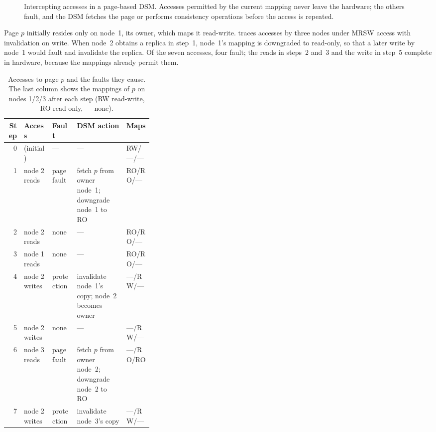 \documentclass[../main.tex]{subfiles}
\begin{document}
\begin{figure}[htbp]
  \centering
  
  \caption{Intercepting accesses in a page-based DSM.  Accesses permitted by
    the current mapping never leave the hardware; the others fault, and the
    DSM fetches the page or performs consistency operations before the
    access is repeated.}
  \label{fig:l15-mmu}
\end{figure}

\begin{example}
  Page $p$ initially resides only on node~1, its owner, which maps it
  read-write.   traces accesses by three nodes under MRSW
  access with invalidation on write.  When node~2 obtains a replica in
  step~1, node~1's mapping is downgraded to read-only, so that a later write
  by node~1 would fault and invalidate the replica.  Of the seven accesses,
  four fault; the reads in steps~2 and~3 and the write in step~5 complete
  in hardware, because the mappings already permit them.
\end{example}

\begin{table}[htbp]
  \centering
  \caption{Accesses to page $p$ and the faults they cause.  The last column
    shows the mappings of $p$ on nodes 1/2/3 after each step (RW
    read-write, RO read-only, --- none).}
  \label{tab:l15-mmu}
  \small
  \begin{tabular}{@{}rll>{\raggedright\arraybackslash}p{0.34\linewidth}l@{}}
    \toprule
    Step & Access & Fault & DSM action & Maps \\
    \midrule
    0 & (initial) & --- & --- & RW/---/--- \\
    1 & node 2 reads & page fault & fetch $p$ from owner node~1; downgrade
      node~1 to RO & RO/RO/--- \\
    2 & node 2 reads & none & --- & RO/RO/--- \\
    3 & node 1 reads & none & --- & RO/RO/--- \\
    4 & node 2 writes & protection & invalidate node~1's copy; node~2
      becomes owner & ---/RW/--- \\
    5 & node 2 writes & none & --- & ---/RW/--- \\
    6 & node 3 reads & page fault & fetch $p$ from owner node~2; downgrade
      node~2 to RO & ---/RO/RO \\
    7 & node 2 writes & protection & invalidate node~3's copy & ---/RW/--- \\
    \bottomrule
  \end{tabular}
\end{table}
\end{document}
